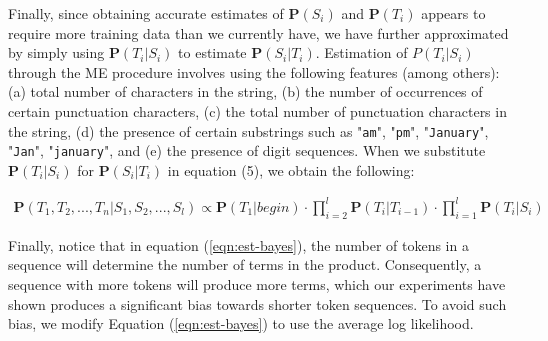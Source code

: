Finally, since obtaining accurate estimates of 
$\mathbf{P}(S_i)$ and $\mathbf{P}(T_i)$ appears to require more training
data than we currently have, we have further approximated by simply
using
$\mathbf{P}(T_i|S_i)$ to estimate $\mathbf{P}(S_i|T_i)$.
Estimation of $P(T_i|S_i)$ through the ME procedure involves using
the following features (among others):
(a) total number of characters in the string,
(b) the number of occurrences of certain punctuation characters,
(c) the total number of punctuation characters in the string,
(d) the presence of certain substrings such as "{\tt am}", "{\tt pm}", 
"{\tt January}", "{\tt Jan}", "{\tt january}", and
(e) the presence of digit sequences.
When we substitute $\mathbf{P}(T_i|S_i)$ for
 $\mathbf{P}(S_i|T_i)$ in equation (5), we obtain the following:

\begin{eqnarray}\label{eqn:est-bayes}
\mathbf{P}(T_1, T_2, ..., T_n|S_1, S_2, ..., S_l) \propto
\mathbf{P}(T_1|begin) \cdot \prod_{i=2}^{l}\mathbf{P}(T_i|T_{i-1})
\cdot \prod_{i=1}^{l}\mathbf{P}(T_i|S_i)
\end{eqnarray}

Finally, notice that in equation (\ref{eqn:est-bayes}), the number of tokens
in a sequence will determine the number of terms in the product. 
Consequently, a sequence with more tokens will produce
more terms, which our experiments have shown produces a significant 
bias towards shorter token sequences.  
To avoid such bias, we modify
Equation (\ref{eqn:est-bayes}) to use the average log likelihood.


